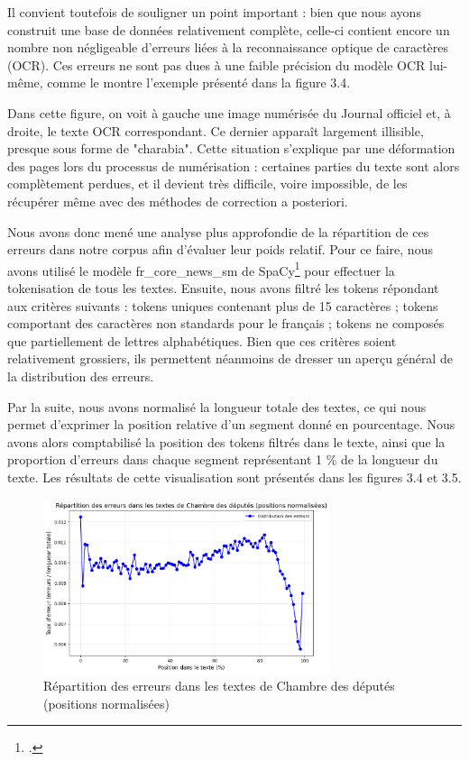 \documentclass[a4paper,twoside,12pt]{book}
\begin{document}
Il convient toutefois de souligner un point important : bien que nous ayons construit une base de données relativement complète, celle-ci contient encore un nombre non négligeable d'erreurs liées à la reconnaissance optique de caractères (OCR). Ces erreurs ne sont pas dues à une faible précision du modèle OCR lui-même, comme le montre l'exemple présenté dans la figure 3.4.

Dans cette figure, on voit à gauche une image numérisée du Journal officiel et, à droite, le texte OCR correspondant. Ce dernier apparaît largement illisible, presque sous forme de "charabia". Cette situation s'explique par une déformation des pages lors du processus de numérisation : certaines parties du texte sont alors complètement perdues, et il devient très difficile, voire impossible, de les récupérer même avec des méthodes de correction a posteriori.

Nous avons donc mené une analyse plus approfondie de la répartition de ces erreurs dans notre corpus afin d'évaluer leur poids relatif. Pour ce faire, nous avons utilisé le modèle fr\_core\_news\_sm de SpaCy\footcite{spacy2} pour effectuer la tokenisation de tous les textes. Ensuite, nous avons filtré les tokens répondant aux critères suivants : tokens uniques contenant plus de 15 caractères ; tokens comportant des caractères non standards pour le français ; tokens ne composés que partiellement de lettres alphabétiques. Bien que ces critères soient relativement grossiers, ils permettent néanmoins de dresser un aperçu général de la distribution des erreurs.

Par la suite, nous avons normalisé la longueur totale des textes, ce qui nous permet d'exprimer la position relative d'un segment donné en pourcentage. Nous avons alors comptabilisé la position des tokens filtrés dans le texte, ainsi que la proportion d'erreurs dans chaque segment représentant 1 \% de la longueur du texte. Les résultats de cette visualisation sont présentés dans les figures 3.4 et 3.5.



\begin{figure}
\centering %
\includegraphics[width=0.75\textwidth]{img/ec.png}
\caption{Répartition des erreurs dans les textes de Chambre des députés (positions normalisées)}
\end{figure}
\end{document}
